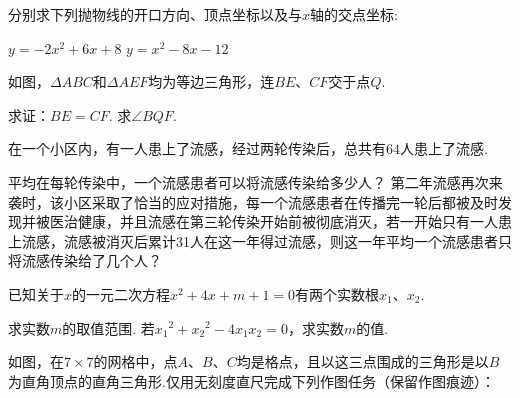 \documentclass[10pt]{article}
\begin{document}
\begin{questions}{\answeringintroduction}
    \question 分别求下列抛物线的开口方向、顶点坐标以及与$x$轴的交点坐标:
    \begin{subquestions}
        \subquestion $y=-2x^2+6x+8$
        \subquestion $y=x^2-8x-12$
    \end{subquestions}
    \addspace
    \question 如图，$\Delta ABC$和$\Delta AEF$均为等边三角形，连$BE$、$CF$交于点$Q$.
    \begin{subquestions}
        \subquestion 求证：$BE=CF$.
        \subquestion 求$\angle BQF$.
    \end{subquestions}
    \begin{figure}[!htb]
        \raggedleft
    \end{figure}
    \question 在一个小区内，有一人患上了流感，经过两轮传染后，总共有$64$人患上了流感.
    \begin{subquestions}
        \subquestion 平均在每轮传染中，一个流感患者可以将流感传染给多少人？
        \subquestion 第二年流感再次来袭时，该小区采取了恰当的应对措施，每一个流感患者在传播完一轮后都被及时发现并被医治健康，并且流感在第三轮传染开始前被彻底消灭，若一开始只有一人患上流感，流感被消灭后累计31人在这一年得过流感，则这一年平均一个流感患者只将流感传染给了几个人？
    \end{subquestions}
    \newpage
    \question 已知关于$x$的一元二次方程$x^2+4x+m+1=0$有两个实数根$x_1$、$x_2$.
    \begin{subquestions}
        \subquestion 求实数$m$的取值范围.
        \subquestion 若${x_1}^2+{x_2}^2-4{x_1}{x_2}=0$，求实数$m$的值.
    \end{subquestions}
    \addspace
    \question 如图，在$7 \times 7$的网格中，点$A$、$B$、$C$均是格点，且以这三点围成的三角形是以$B$为直角顶点的直角三角形.仅用无刻度直尺完成下列作图任务（保留作图痕迹）：

\end{questions}
\end{document}
